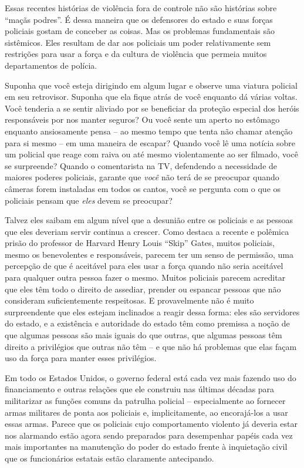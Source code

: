 Essas recentes histórias de violência fora de controle não são histórias sobre ``maçãs podres''. É dessa maneira que os defensores do estado e suas forças policiais gostam de conceber as coisas. Mas os problemas fundamentais são sistêmicos. Eles resultam de dar aos policiais um poder relativamente sem restrições para usar a força e da cultura de violência que permeia muitos departamentos de polícia.

Suponha que você esteja dirigindo em algum lugar e observe uma viatura policial em seu retrovisor. Suponha que ela fique atrás de você enquanto dá várias voltas. Você tenderia a se sentir aliviado por se beneficiar da proteção especial dos heróis responsáveis por nos manter seguros? Ou você sente um aperto no estômago enquanto ansiosamente pensa -- ao mesmo tempo que tenta não chamar atenção para si mesmo -- em uma maneira de escapar? Quando você lê uma notícia sobre um policial que reage com raiva ou até mesmo violentamente ao ser filmado, você se surpreende? Quando o comentarista na TV, defendendo a necessidade de maiores poderes policiais, garante que \emph{você} não terá de se preocupar quando câmeras forem instaladas em todos os cantos, você se pergunta com o que os policiais pensam que \emph{eles} devem se preocupar?

Talvez eles saibam em algum nível que a desunião entre os policiais e as pessoas que eles deveriam servir continua a crescer. Como destaca a recente e polêmica prisão do professor de Harvard Henry Louis ``Skip'' Gates, muitos policiais, mesmo os benevolentes e responsáveis, parecem ter um senso de permissão, uma percepção de que é aceitável para eles usar a força quando não seria aceitável para qualquer outra pessoa fazer o mesmo. Muitos policiais parecem acreditar que eles têm todo o direito de assediar, prender ou espancar pessoas que não consideram suficientemente respeitosas. E provavelmente não é muito surpreendente que eles estejam inclinados a reagir dessa forma: eles são servidores do estado, e a existência e autoridade do estado têm como premissa a noção de que algumas pessoas são mais iguais do que outras, que algumas pessoas têm direito a privilégios que outras não têm -- e que não há problemas que elas façam uso da força para manter esses privilégios.

Em todo os Estados Unidos, o governo federal está cada vez mais fazendo uso do financiamento e outras relações que ele construiu nas últimas décadas para militarizar as funções comuns da patrulha policial -- especialmente ao fornecer armas militares de ponta aos policiais e, implicitamente, ao encorajá-los a usar essas armas. Parece que os policiais cujo comportamento violento já deveria estar nos alarmando estão agora sendo preparados para desempenhar papéis cada vez mais importantes na manutenção do poder do estado frente à inquietação civil que os funcionários estatais estão claramente antecipando.

